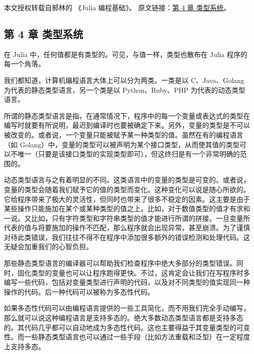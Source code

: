 
本文授权转载自郝林的 《Julia 编程基础》。 原文链接：\href{https://github.com/hyper0x/JuliaBasics/blob/master/book/ch04.md}{第 4 章 类型系统}。

\subsection{第 4 章 类型系统}

在 Julia 中，任何值都是有类型的。可见，与值一样，类型也散布在 Julia 程序的每一个角落。

我们都知道，计算机编程语言大体上可以分为两类。一类是以 C、Java、Golang 为代表的静态类型语言，另一个类是以 Python、Ruby、PHP 为代表的动态类型语言。

所谓的静态类型语言是指，在通常情况下，程序中的每一个变量或表达式的类型在编写时就要有所说明，最迟到编译时也要被确定下来。另外，变量的类型是不可以被改变的。或者说，一个变量只能被赋予某一种类型的值。虽然在有的编程语言（如 Golang）中，变量的类型可以被声明为某个接口类型，从而使其值的类型可以不唯一（只要是该接口类型的实现类型即可），但这终归是有一个非常明确的范围的。

动态类型语言与之有着明显的不同。这类语言中的变量的类型是可变的。或者说，变量的类型会随着我们赋予它的值的类型而变化。这种变化可以说是随心所欲的。它给程序带来了极大的灵活性，但同时也带来了很多不稳定的因素。这主要是由于某些操作只能施加在某个或某种类型的值之上。比如，对于数值类型的值才有求和一说。又比如，只有字符类型和字符串类型的值才能进行所谓的拼接。一旦变量所代表的值与将要施加的操作不匹配，那么程序就会出现异常，甚至崩溃。为了谨慎对待此类错误，我们往往不得不在程序中添加很多额外的错误检测和处理代码。这无疑会加重我们的心智负担。

那些静态类型语言的编译器可以帮助我们检查程序中绝大多部分的类型错误。同时，固化类型的变量也可以让程序跑得更快。不过，这肯定会让我们在写程序时多编写一些代码，包括对变量类型进行声明的代码，以及对不同类型的值实现同一种操作的代码。后一种代码可以被称为多态性代码。

如果多态性代码可以由编程语言提供的一些工具简化，而不用我们完全手动编写，那么就可以说这种编程语言是支持多态的。绝大多数动态类型语言都是支持多态的。其代码几乎都可以自动地成为多态性代码。这也主要得益于其变量类型的可变性。而一些静态类型语言也可以通过一些手段（比如方法重载和泛型）在一定程度上支持多态。
